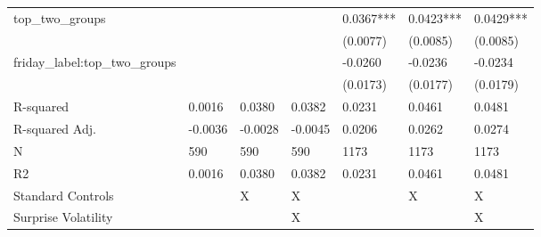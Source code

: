 \begin{tabular}{lllllll}
top_two_groups &  &  &  & 0.0367*** & 0.0423*** & 0.0429*** \\
 &  &  &  & (0.0077) & (0.0085) & (0.0085) \\
friday_label:top_two_groups &  &  &  & -0.0260 & -0.0236 & -0.0234 \\
 &  &  &  & (0.0173) & (0.0177) & (0.0179) \\
R-squared & 0.0016 & 0.0380 & 0.0382 & 0.0231 & 0.0461 & 0.0481 \\
R-squared Adj. & -0.0036 & -0.0028 & -0.0045 & 0.0206 & 0.0262 & 0.0274 \\
N & 590 & 590 & 590 & 1173 & 1173 & 1173 \\
R2 & 0.0016 & 0.0380 & 0.0382 & 0.0231 & 0.0461 & 0.0481 \\
Standard Controls &  & X & X &  & X & X \\
Surprise Volatility &  &  & X &  &  & X \\
\bottomrule
\end{tabular}
